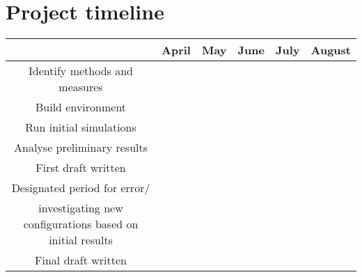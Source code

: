 \documentclass{article}
\begin{document}
\section{Project timeline}

\begin{tabular}{|c|c|c|c|c|c|}
\hline
    & April & May & June & July & August \\
\hline 
    Identify methods and measures & \cellcolor{blue!25} & &&&\\
\hline
    Build environment & \cellcolor{blue!25} & \cellcolor{blue!25}&&& \\
\hline
    Run initial simulations &&\cellcolor{blue!25}&\cellcolor{blue!25}&& \\
\hline
Analyse preliminary results &&&\cellcolor{blue!25}&& \\
\hline
First draft written &&&&\cellcolor{blue!25}& \\
\hline
Designated period for error/&&&&\cellcolor{blue!25}&\cellcolor{blue!25} \\
investigating new configurations based on initial results &&&&\cellcolor{blue!25}&\cellcolor{blue!25} \\
\hline
Final draft written &&&&&\cellcolor{blue!25} \\
\hline
\end{tabular}



\end{document}
